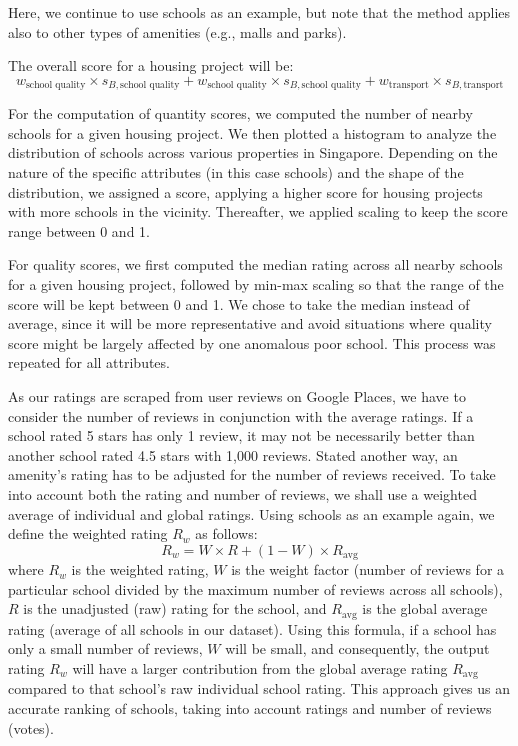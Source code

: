 \documentclass[a4paper, 11pt]{article}
\begin{document}
Here, we continue to use schools as an example, but note that the method applies also to other types of amenities (e.g., malls and parks).

The overall score for a housing project will be: \[ w_{\text{school quality}} \times s_{B,\text{school quality}} + w_{\text{school quality}} \times s_{B,\text{school quality}} + w_{\text{transport}} \times s_{B,\text{transport}} \]

For the computation of quantity scores, we computed the number of nearby schools for a given housing project. We then plotted a histogram to analyze the distribution of schools across various properties in Singapore. Depending on the nature of the specific attributes (in this case schools) and the shape of the distribution, we assigned a score, applying a higher score for housing projects with more schools in the vicinity. Thereafter, we applied scaling to keep the score range between 0 and 1.

For quality scores, we first computed the median rating across all nearby schools for a given housing project, followed by min-max scaling so that the range of the score will be kept between 0 and 1. We chose to take the median instead of average, since it will be more representative and avoid situations where quality score might be largely affected by one anomalous poor school. This process was repeated for all attributes.

As our ratings are scraped from user reviews on Google Places, we have to consider the number of reviews in conjunction with the average ratings. If a school rated 5 stars has only 1 review, it may not be necessarily better than another school rated 4.5 stars with 1,000 reviews. Stated another way, an amenity's rating has to be adjusted for the number of reviews received. To take into account both the rating and number of reviews, we shall use a weighted average of individual and global ratings. Using schools as an example again, we define the weighted rating $R_w$ as follows:
\[ R_w = W\times R +(1-W)\times R_{\text{avg}}\] where $R_w$ is the weighted rating, $W$ is the weight factor (number of reviews for a particular school divided by the maximum number of reviews across all schools), $R$ is the unadjusted (raw) rating for the school, and $R_{\text{avg}}$ is the global average rating (average of all schools in our dataset). Using this formula, if a school has only a small number of reviews, $W$ will be small, and consequently, the output rating $R_w$ will have a larger contribution from the global average rating $R_{\text{avg}}$ compared to that school's raw individual school rating. This approach gives us an accurate ranking of schools, taking into account ratings and number of reviews (votes).
\end{document}
